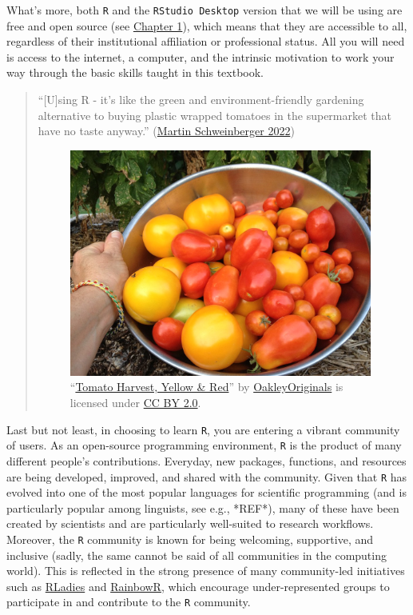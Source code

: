 \documentclass[
  letterpaper,
  DIV=11,
  numbers=noendperiod,
  oneside]{scrreprt}
\begin{document}
What's more, both \texttt{R} and the \texttt{RStudio\ Desktop} version
that we will be using are free and open source (see
\href{https://elenlefoll.github.io/RstatsTextbook/OpenScholarship.html}{Chapter
1}), which means that they are accessible to all, regardless of their
institutional affiliation or professional status. All you will need is
access to the internet, a computer, and the intrinsic motivation to work
your way through the basic skills taught in this textbook.

\begin{quote}
``{[}U{]}sing R - it's like the green and environment-friendly gardening
alternative to buying plastic wrapped tomatoes in the supermarket that
have no taste anyway.''
(\href{https://slcladal.github.io/whyr.html}{Martin Schweinberger 2022})

\begin{figure}

\includegraphics[width=3.91667in,height=\textheight]{images/TomatoHarvest.jpg}

\caption{\label{fig-tomatoes}``\href{https://www.flickr.com/photos/47264866@N00/9455141053}{Tomato
Harvest, Yellow \& Red}'' by
\href{https://www.flickr.com/photos/47264866@N00}{OakleyOriginals} is
licensed under
\href{https://creativecommons.org/licenses/by/2.0/?ref=openverse}{CC BY
2.0}.}

\end{figure}%
\end{quote}

Last but not least, in choosing to learn \texttt{R}, you are entering a
vibrant community of users. As an open-source programming environment,
\texttt{R} is the product of many different people's contributions.
Everyday, new packages, functions, and resources are being developed,
improved, and shared with the community. Given that \texttt{R} has
evolved into one of the most popular languages for scientific
programming (and is particularly popular among linguists, see e.g.,
*REF*), many of these have been created by scientists and are
particularly well-suited to research workflows. Moreover, the \texttt{R}
community is known for being welcoming, supportive, and inclusive
(sadly, the same cannot be said of all communities in the computing
world). This is reflected in the strong presence of many community-led
initiatives such as \href{https://rladies.org/}{RLadies} and
\href{https://rainbowr.netlify.app/}{RainbowR}, which encourage
under-represented groups to participate in and contribute to the
\texttt{R} community. 🤗
\end{document}
